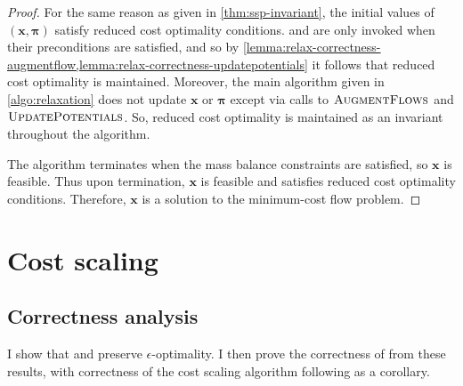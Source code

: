 \relaxcorrectness*
\begin{proof}
    For the same reason as given in \cref{thm:ssp-invariant}, the initial values of $\left(\mathbf{x},\boldsymbol{\pi}\right)$ satisfy reduced cost optimality conditions.  and  are only invoked when their preconditions are satisfied, and so by \cref{lemma:relax-correctness-augmentflow,lemma:relax-correctness-updatepotentials} it follows that reduced cost optimality is maintained. Moreover, the main algorithm given in \cref{algo:relaxation} does not update $\mathbf{x}$ or $\boldsymbol{\pi}$ except via calls to $\textproc{AugmentFlows}$ and $\textproc{UpdatePotentials}$. So, reduced cost optimality is maintained as an invariant throughout the algorithm.
    
    The algorithm terminates when the mass balance constraints are satisfied, so $\mathbf{x}$ is feasible. Thus upon termination, $\mathbf{x}$ is feasible and satisfies reduced cost optimality conditions. Therefore, $\mathbf{x}$ is a solution to the minimum-cost flow problem. 
\end{proof}

\section{Cost scaling} \label{appendix:impl-cs}

\subsection{Correctness analysis} \label{appendix:impl-cs:correctness}

I show that  and  preserve $\epsilon$-optimality. I then prove the correctness of  from these results, with correctness of the cost scaling algorithm following as a corollary.\\

